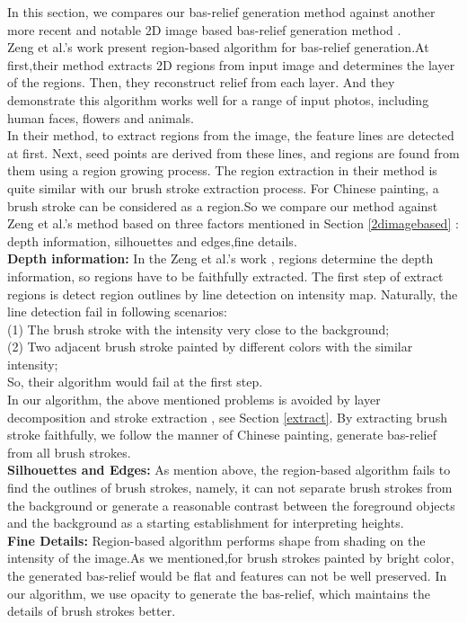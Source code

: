 In this section, we compares our bas-relief generation method against another more recent and notable 2D image based bas-relief generation method \cite{zeng2014region}. \\
Zeng et al.'s work \cite{zeng2014region} present region-based algorithm for bas-relief generation.At first,their method extracts 2D regions from input image and determines the layer of the regions. Then, they reconstruct relief from each layer. And they demonstrate this algorithm works well for a range of input photos, including human faces, flowers and animals.\\
In their method, to extract regions from the image, the feature lines are detected at first. Next, seed points are derived from these lines, and regions are found from them using a region growing process. The region extraction in their method is quite similar with our brush stroke extraction process. For Chinese painting, a brush stroke can be considered as a region.So we compare our method against Zeng et al.'s method \cite{zeng2014region} based on three factors mentioned in Section \ref{2dimagebased} : depth information, silhouettes and edges,fine details. \\
\textbf{Depth information:} In the Zeng et al.'s work \cite{zeng2014region} , regions determine the depth information, so regions have to be faithfully extracted. The first step of extract regions is detect region outlines by line detection on intensity map. Naturally, the line detection fail in following scenarios: \\
(1) The brush stroke with the intensity very close to the background; \\
(2) Two adjacent brush stroke painted by different colors with the similar intensity;\\
So, their algorithm would fail at the first step.\\
In our algorithm, the above mentioned problems is avoided by layer decomposition and stroke extraction , see Section \ref{extract}. By extracting brush stroke faithfully, we follow the manner of Chinese painting, generate bas-relief from all brush strokes. \\
\textbf{Silhouettes and Edges:} As mention above, the region-based algorithm fails to find the outlines of brush strokes, namely, it can not separate brush strokes from the background or generate a reasonable contrast between the foreground objects and the background as a starting establishment for interpreting heights.\\
\textbf{Fine Details:} Region-based algorithm performs shape from shading on the intensity of the image.As we mentioned,for brush strokes painted by bright color, the generated bas-relief would be flat and features can not be well preserved. In our algorithm, we use opacity to generate the bas-relief, which maintains the details of brush strokes better.  \\

 